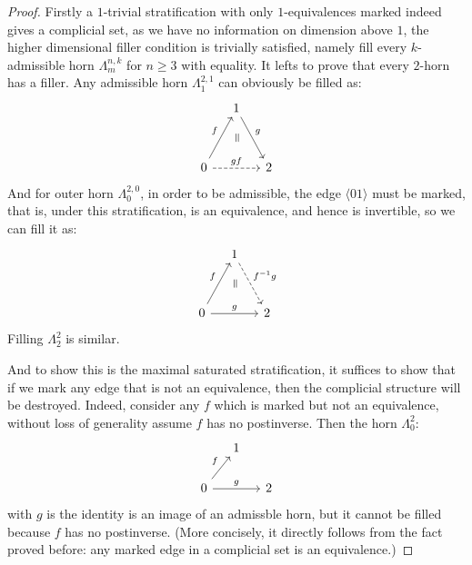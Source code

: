 \documentclass[11pt]{article}
\newcommand{\veq}{\rotatebox[origin=c]{-90}{$=$}}
\begin{document}
\begin{proof}
	Firstly a $1$-trivial stratification with only $1$-equivalences marked indeed gives a complicial set, as we have no information on dimension above $1$, the higher dimensional filler condition is trivially satisfied, namely fill every $k$-admissible horn $\Lambda^{n,k}_m$ for $n\ge 3$ with equality. It lefts to prove that every $2$-horn has a filler. Any admissible horn $\Lambda^{2,1}_1$ can obviously be filled as:
	  \begin{equation*}
	\begin{tikzcd}[column sep=small, row sep=small]
	& 1 \arrow{rdd}{g} \\
	& \veq \\
	0 \arrow{uur}{f} \arrow[dashed]{rr}{gf} &  & 2
	\end{tikzcd}
	\end{equation*}
	And for outer horn $\Lambda^{2,0}_0$, in order to be admissible, the edge $\langle 01\rangle$ must be marked, that is, under this stratification, is an equivalence, and hence is invertible, so we can fill it as:
	  \begin{equation*}
	\begin{tikzcd}[column sep=small, row sep=small]
	& 1 \arrow[dashed]{rdd}{f^{-1}g} \\
	& \veq \\
	0 \arrow{uur}{f} \arrow{rr}{g} &  & 2
	\end{tikzcd}
	\end{equation*}
	Filling $\Lambda^2_2$ is similar.
	
	And to show this is the maximal saturated stratification, it suffices to show that if we mark any edge that is not an equivalence, then the complicial structure will be destroyed. Indeed, consider any $f$ which is marked but not an equivalence, without loss of generality assume $f$ has no postinverse. Then the horn $\Lambda^2_0$:
	  \begin{equation*}
	\begin{tikzcd}[column sep=small, row sep=small]
	& 1  \\
	&  \\
	0 \arrow{uur}{f} \arrow{rr}{g} &  & 2
	\end{tikzcd}
	\end{equation*}
	with $g$ is the identity is an image of an admissble horn, but it cannot be filled because $f$ has no postinverse. (More concisely, it directly follows from the fact proved before: any marked edge in a complicial set is an equivalence.)
\end{proof}
\end{document}
